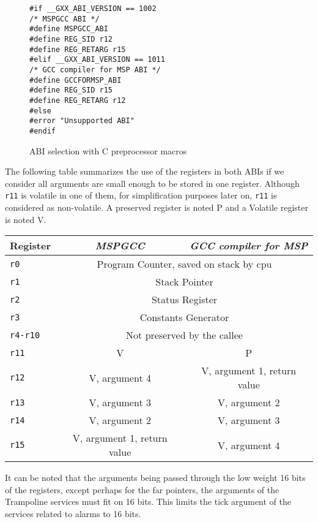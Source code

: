 \documentclass[11pt, oneside]{article}   	%
\begin{document}
\begin{figure}[h]
\caption{ABI selection with C preprocessor macros}
\begin{lstlisting}
#if __GXX_ABI_VERSION == 1002
/* MSPGCC ABI */
#define MSPGCC_ABI
#define REG_SID r12
#define REG_RETARG r15
#elif __GXX_ABI_VERSION == 1011
/* GCC compiler for MSP ABI */
#define GCCFORMSP_ABI
#define REG_SID r15
#define REG_RETARG r12
#else
#error "Unsupported ABI"
#endif
\end{lstlisting}
\label{lst:macroabi}
\end{figure}

The following table summarizes the use of the registers in both ABIs if we consider all arguments are small enough to be stored in one register. Although \lstinline{r11} is volatile in one of them, for simplification purposes later on, \lstinline{r11} is considered as non-volatile. A preserved register is noted P and a Volatile register is noted V.

\begin{center}
\begin{tabular}{|l|c|c|}
\hline
Register & \emph{MSPGCC} & \emph{GCC compiler for MSP} \\
\hline
\hline
\lstinline|r0| & \multicolumn{2}{c|}{Program Counter, saved on stack by cpu} \\
\hline
\lstinline|r1| & \multicolumn{2}{c|}{Stack Pointer} \\
\hline
\lstinline|r2| & \multicolumn{2}{c|}{Status Register} \\
\hline
\lstinline|r3| & \multicolumn{2}{c|}{Constants Generator} \\
\hline
\lstinline|r4-r10| & \multicolumn{2}{c|}{Not preserved by the callee} \\
\hline
\lstinline|r11| & V & P \\
\hline
\lstinline|r12| & V, argument 4 & V, argument 1, return value \\
\hline
\lstinline|r13| & V, argument 3 & V, argument 2 \\
\hline
\lstinline|r14| & V, argument 2 & V, argument 3 \\
\hline
\lstinline|r15| & V, argument 1, return value & V, argument 4 \\
\hline
\end{tabular}
\end{center}


It can be noted that the arguments being passed through the low weight 16 bits of the registers, except perhaps for the far pointers, the arguments of the Trampoline services must fit on 16 bits. This limits the tick argument of the services related to alarms to 16 bits. 
\end{document}
